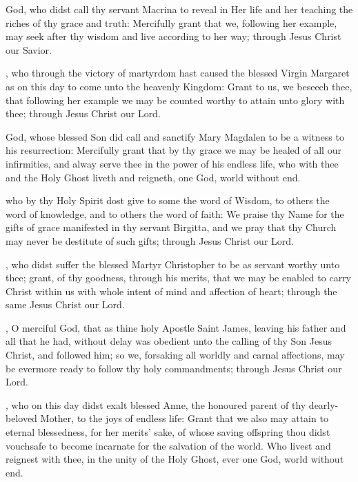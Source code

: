 God, who didst call thy servant Macrina to reveal in Her life and her teaching the riches of thy grace and truth: Mercifully grant that we, following her example, may seek after thy wisdom and live according to her way; through Jesus Christ our Savior.

, who through the victory of martyrdom hast caused the blessed Virgin Margaret as on this day to come unto the heavenly Kingdom: Grant to us, we beseech thee, that following her example we may be counted worthy to attain unto glory with thee; through Jesus Christ our Lord.

 God, whose blessed Son did call and sanctify Mary Magdalen to be a witness to his resurrection: Mercifully grant that by thy grace we may be healed of all our infirmities, and alway serve thee in the power of his endless life, who with thee and the Holy Ghost liveth and reigneth, one God, world without end.

 who by thy Holy Spirit dost give to some the word of Wisdom, to others the word of knowledge, and to others the word of faith: We praise thy Name for the gifts of grace manifested in thy servant Birgitta, and we pray that thy Church may never be destitute of such gifts; through Jesus Christ our Lord.

, who didst suffer the blessed Martyr Christopher to be as servant worthy unto thee; grant, of thy goodness, through his merits, that we may be enabled to carry Christ within us with whole intent of mind and affection of heart; through the same Jesus Christ our Lord.

, O merciful God, that as thine holy Apostle Saint James, leaving his father and all that he had, without delay was obedient unto the calling of thy Son Jesus Christ, and followed him; so we, forsaking all worldly and carnal affections, may be evermore ready to follow thy holy commandments; through Jesus Christ our Lord.

, who on this day didst exalt blessed Anne, the honoured parent of thy dearly-beloved Mother, to the joys of endless life: Grant that we also may attain to eternal blessedness, for her merits' sake, of whose saving offspring thou didst vouchsafe to become incarnate for the salvation of the world. Who livest and reignest with thee, in the unity of the Holy Ghost, ever one God, world without end.

